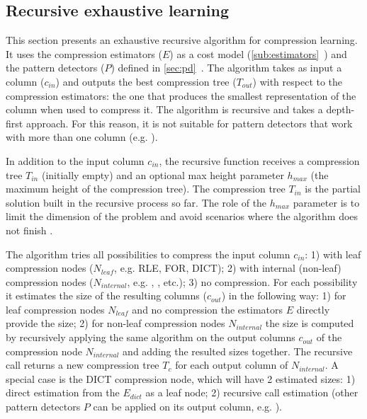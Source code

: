 \subsection{Recursive exhaustive learning}
\label{sub:learning:recursiveexhaustive}





% 

This section presents an exhaustive recursive algorithm for compression learning. It uses the compression estimators (\(E\)) as a cost model (\ref{sub:estimators}~) and the pattern detectors (\(P\)) defined in \ref{sec:pd}~. The algorithm takes as input a column (\(c_{in}\)) and outputs the best compression tree (\(T_{out}\)) with respect to the compression estimators: the one that produces the smallest representation of the column when used to compress it. The algorithm is recursive and takes a depth-first approach. For this reason, it is not suitable for pattern detectors that work with more than one column (e.g. ).

In addition to the input column \(c_{in}\), the recursive function receives a compression tree \(T_{in}\) (initially empty) and an optional max height parameter \(h_{max}\) (the maximum height of the compression tree). The compression tree \(T_{in}\) is the partial solution built in the recursive process so far. The role of the \(h_{max}\) parameter is to limit the dimension of the problem and avoid scenarios where the algorithm does not finish .

The algorithm tries all possibilities to compress the input column \(c_{in}\): 1) with leaf compression nodes (\(N_{leaf}\), e.g. RLE, FOR, DICT); 2) with internal (non-leaf) compression nodes (\(N_{internal}\), e.g. , , etc.); 3) no compression. For each possibility it estimates the size of the resulting columns (\(c_{out}\)) in the following way: 1) for leaf compression nodes \(N_{leaf}\) and no compression the estimators \(E\) directly provide the size; 2) for non-leaf compression nodes \(N_{internal}\) the size is computed by recursively applying the same algorithm on the output columns \(c_{out}\) of the compression node \(N_{internal}\) and adding the resulted sizes together. The recursive call returns a new compression tree \(T_{c}\) for each output column of \(N_{internal}\). A special case is the DICT compression node, which will have 2 estimated sizes: 1) direct estimation from the  \(E_{dict}\) as a leaf node; 2) recursive call estimation (other pattern detectors \(P\) can be applied on its output column, e.g. ).

